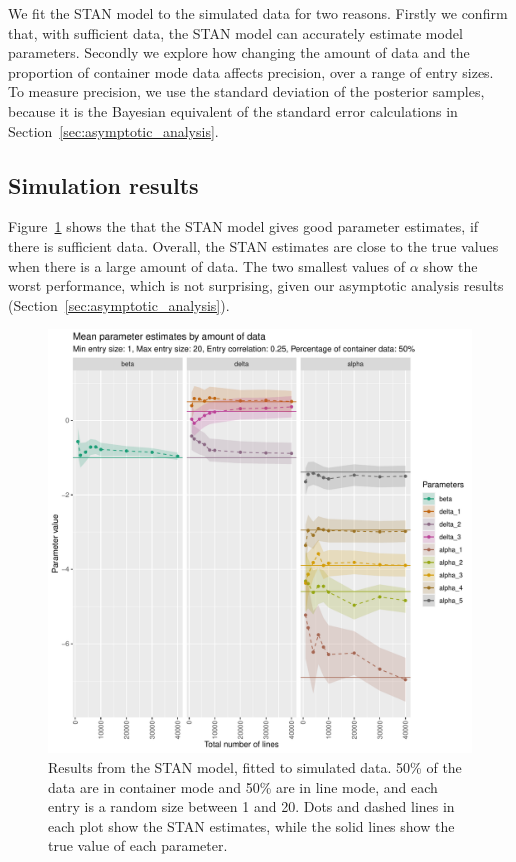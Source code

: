 \documentclass{article}
\begin{document}
We fit the STAN model to the simulated data for two reasons. Firstly we confirm that, with sufficient data, the STAN model can accurately estimate model parameters. Secondly we explore how changing the amount of data and the proportion of container mode data affects precision, over a range of entry sizes. To measure precision, we use the standard deviation of the posterior samples, because it is the Bayesian equivalent of the standard error calculations in Section~\ref{sec:asymptotic_analysis}.

\subsection{Simulation results}

Figure~\ref{fig:simulation_estimation} shows the that the STAN model gives good parameter estimates, if there is sufficient data. Overall, the STAN estimates are close to the true values when there is a large amount of data. The two smallest values of \(\alpha\) show the worst performance, which is not surprising, given our asymptotic analysis results (Section~\ref{sec:asymptotic_analysis}).  

\begin{figure}[h!]
\includegraphics[width=\textwidth]{../visualisations/figures/simulation_estimates_random_effect.pdf}
\caption{Results from the STAN model, fitted to simulated data. 50\% of the data are in container mode and 50\% are in line mode, and each entry is a random size between 1 and 20. Dots and dashed lines in each plot show the STAN estimates, while the solid lines show the true value of each parameter.}
\label{fig:simulation_estimation}
\end{figure}
\end{document}
